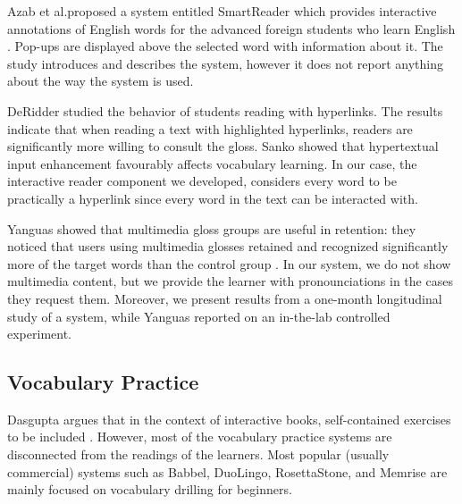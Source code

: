 	Azab et al.proposed a system entitled SmartReader which provides interactive annotations of English words for the advanced foreign students who learn English  \cite{Azab13-nlp}.
	Pop-ups are displayed above the selected word with information about it. 
	The study introduces and describes the system, however it does not report anything about the way the system is used.


	DeRidder \cite{DeRidder02-Links} studied the behavior of students reading with hyperlinks. The results indicate that when reading a text with highlighted hyperlinks, readers are significantly more willing to consult the gloss. Sanko \cite{Sanko06-Effects} showed that hypertextual input enhancement favourably affects vocabulary learning.
% 
	In our case, the interactive reader component we developed, considers every word to be practically a hyperlink since every word in the text can be interacted with. 


	Yanguas showed that multimedia gloss groups are useful in retention: they noticed that users using multimedia glosses retained and recognized significantly more of the target words than the control group \cite{Yang09-Glosses}. In our system, we do not show multimedia content, but we provide the learner with pronounciations in the cases they request them. Moreover, we present results from a one-month longitudinal study of a system, while Yanguas reported on an in-the-lab controlled experiment.









\subsection{Vocabulary Practice}


Dasgupta argues that in the context of interactive books, self-contained exercises to be included \cite{Dasgupta10-Play}. However, most of the vocabulary practice systems are disconnected from the readings of the learners. Most popular (usually commercial) systems such as Babbel, DuoLingo, RosettaStone, and Memrise are mainly focused on vocabulary drilling for beginners. 

